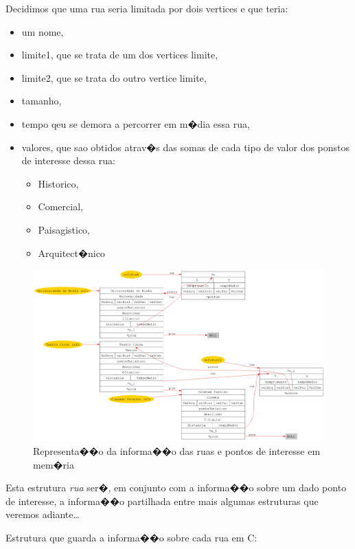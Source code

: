 \documentclass[11pt,a4paper]{article}
\newenvironment{mtc}{\secttoc\sectlof}{\pagebreak}
\begin{document}
\begin{mtc}
Decidimos que uma rua seria limitada por dois vertices e que teria:
\begin{itemize}
 \item um nome,
 \item limite1, que se trata de um dos vertices limite,
 \item limite2, que se trata do outro vertice limite,
 \item tamanho,
 \item tempo qeu se demora a percorrer em m�dia essa rua,
 \item valores, que sao obtidos atrav�s das somas de cada tipo de valor dos ponstos de interesse dessa rua:
 \begin{itemize}
  \item Historico,
  \item Comercial,
  \item Paisagistico,
  \item Arquitect�nico
 \end{itemize}
\end{itemize}

\begin{figure}[!ht]\label{rua}
    \centering
        \includegraphics[width=1\textwidth]{stuff/rua.png}
    \caption{Representa��o da informa��o das ruas e pontos de interesse em mem�ria}
\end{figure}

Esta estrutura \textit{rua} ser�, em conjunto com a informa��o sobre um dado ponto de interesse, a informa��o partilhada
entre mais algumas estruturas que veremos adiante\ldots

Estrutura que guarda a informa��o sobre cada rua em \textsf{C}:
\lstset{language=C_ulisses}



\end{mtc}
\end{document}
